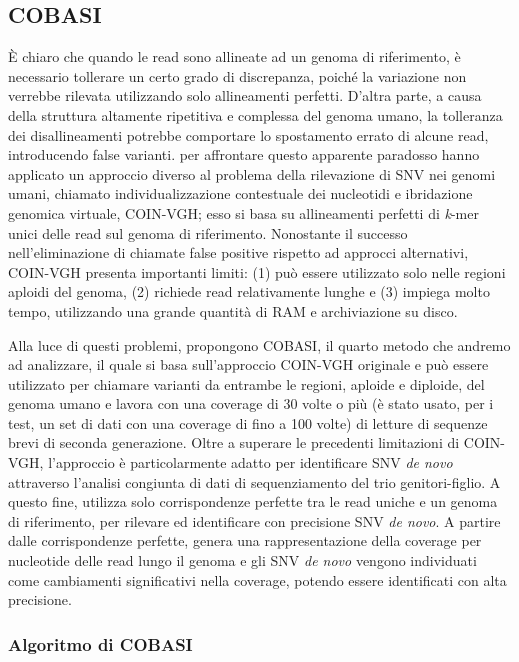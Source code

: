\documentclass[../main.tex]{subfiles}
\begin{document}
\subsection{COBASI}
\label{cobasi}
 
È chiaro che quando le read sono allineate ad un genoma di riferimento, è necessario tollerare un certo grado di discrepanza, poiché la variazione non verrebbe rilevata utilizzando solo allineamenti perfetti. D'altra parte, a causa della struttura altamente ripetitiva e complessa del genoma umano, la tolleranza dei disallineamenti potrebbe comportare lo spostamento errato di alcune read, introducendo false varianti. \cite{gomez-romero2018cobasi} per affrontare questo apparente paradosso hanno applicato un approccio diverso al problema della rilevazione di SNV nei genomi umani, chiamato individualizzazione contestuale dei nucleotidi e ibridazione genomica virtuale, COIN-VGH; esso si basa su allineamenti perfetti di \textit{k}-mer unici delle read sul genoma di riferimento. Nonostante il successo nell'eliminazione di chiamate false positive rispetto ad approcci alternativi, COIN-VGH presenta importanti limiti: (1) può essere utilizzato solo nelle regioni aploidi del genoma, (2) richiede read relativamente lunghe e (3) impiega molto tempo,  utilizzando una grande quantità di RAM e archiviazione su disco.

Alla luce di questi problemi, \cite{gomez-romero2018cobasi} propongono COBASI, il quarto metodo che andremo ad analizzare, il quale si basa sull'approccio COIN-VGH originale e può essere utilizzato per chiamare varianti da entrambe le regioni, aploide e diploide, del genoma umano e lavora con una coverage di 30 volte o più (è stato usato, per i test, un set di dati con una coverage di fino a 100 volte) di letture di sequenze brevi di seconda generazione. Oltre a superare le precedenti limitazioni di COIN-VGH, l'approccio è particolarmente adatto per identificare SNV \textit{de novo} attraverso l'analisi congiunta di dati di sequenziamento del trio genitori-figlio. A questo fine, utilizza solo corrispondenze perfette tra le read uniche e un genoma di riferimento, per rilevare ed identificare con precisione SNV \textit{de novo}. A partire dalle corrispondenze perfette, genera una rappresentazione della coverage per nucleotide delle read lungo il genoma e gli SNV \textit{de novo} vengono individuati come cambiamenti significativi nella coverage, potendo essere identificati con alta precisione.  


\subsubsection{Algoritmo di COBASI}
\end{document}
